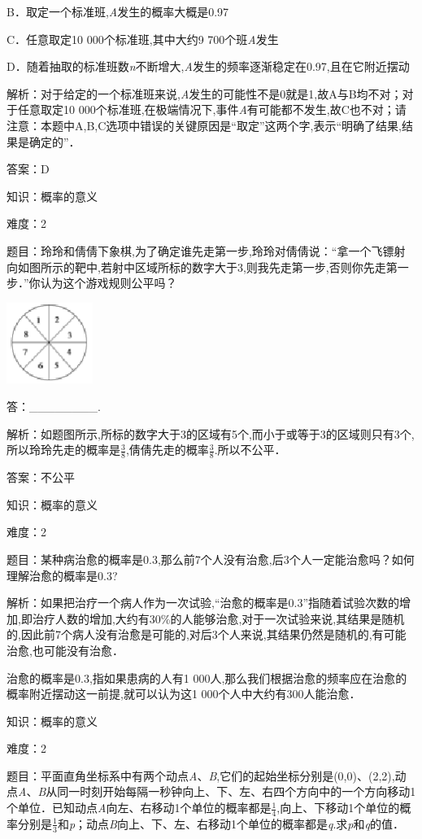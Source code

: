 \documentclass{article} %
\begin{document}
B．取定一个标准班,\textit{A}发生的概率大概是0.97

C．任意取定10 000个标准班,其中大约9 700个班\textit{A}发生

D．随着抽取的标准班数\textit{n}不断增大,\textit{A}发生的频率逐渐稳定在0.97,且在它附近摆动

解析：对于给定的一个标准班来说,\textit{A}发生的可能性不是0就是1,故A与B均不对；对于任意取定10 000个标准班,在极端情况下,事件\textit{A}有可能都不发生,故C也不对；请注意：本题中A,B,C选项中错误的关键原因是“取定”这两个字,表示``明确了结果,结果是确定的''．

答案：D

知识：概率的意义

难度：2

题目：玲玲和倩倩下象棋,为了确定谁先走第一步,玲玲对倩倩说：``拿一个飞镖射向如图所示的靶中,若射中区域所标的数字大于3,则我先走第一步,否则你先走第一步．''你认为这个游戏规则公平吗？

\includegraphics*[width=1.10in, height=1.04in, keepaspectratio=false]{image100}

答：\_\_\_\_\_\_\_\_.

解析：如题图所示,所标的数字大于3的区域有5个,而小于或等于3的区域则只有3个,所以玲玲先走的概率是$\frac{3}{8}$,倩倩先走的概率$\frac{3}{8}$.所以不公平．

答案：不公平

知识：概率的意义

难度：2

题目：某种病治愈的概率是0.3,那么前7个人没有治愈,后3个人一定能治愈吗？如何理解治愈的概率是0.3?

解析：如果把治疗一个病人作为一次试验,``治愈的概率是0.3''指随着试验次数的增加,即治疗人数的增加,大约有30\%的人能够治愈,对于一次试验来说,其结果是随机的,因此前7个病人没有治愈是可能的,对后3个人来说,其结果仍然是随机的,有可能治愈,也可能没有治愈．

治愈的概率是0.3,指如果患病的人有1 000人,那么我们根据治愈的频率应在治愈的概率附近摆动这一前提,就可以认为这1 000个人中大约有300人能治愈．

知识：概率的意义

难度：2

题目：平面直角坐标系中有两个动点\textit{A}、\textit{B},它们的起始坐标分别是(0,0)、(2,2),动点\textit{A}、\textit{B}从同一时刻开始每隔一秒钟向上、下、左、右四个方向中的一个方向移动1个单位．已知动点\textit{A}向左、右移动1个单位的概率都是$\frac{1}{4}$,向上、下移动1个单位的概率分别是$\frac{1}{3}$和\textit{p}；动点\textit{B}向上、下、左、右移动1个单位的概率都是\textit{q}.求\textit{p}和\textit{q}的值．
\end{document}
